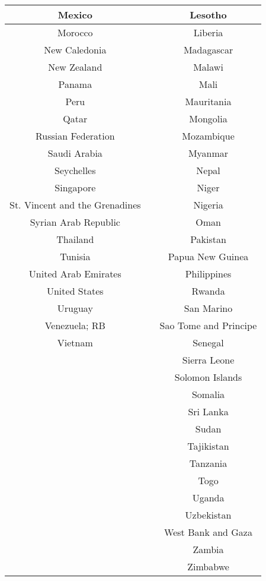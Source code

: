 \begin{center}
\begin{longtable}{|c|c|c|}
\hline
Mexico&&Lesotho\\
\hline
Morocco&&Liberia\\
\hline
New Caledonia&&Madagascar\\
\hline
New Zealand&&Malawi\\
\hline
Panama&&Mali\\
\hline
Peru&&Mauritania\\
\hline
Qatar&&Mongolia\\
\hline
Russian Federation&&Mozambique\\
\hline
Saudi Arabia&&Myanmar\\
\hline
Seychelles&&Nepal\\
\hline
Singapore&&Niger\\
\hline
St. Vincent and the Grenadines&&Nigeria\\
\hline
Syrian Arab Republic&&Oman\\
\hline
Thailand&&Pakistan\\
\hline
Tunisia&&Papua New Guinea\\
\hline
United Arab Emirates&&Philippines\\
\hline
United States&&Rwanda\\
\hline
Uruguay&&San Marino\\
\hline
Venezuela; RB&&Sao Tome and Principe\\
\hline
Vietnam&&Senegal\\
\hline
&&Sierra Leone\\
\hline
&&Solomon Islands\\
\hline
&&Somalia\\
\hline
&&Sri Lanka\\
\hline
&&Sudan\\
\hline
&&Tajikistan\\
\hline
&&Tanzania\\
\hline
&&Togo\\
\hline
&&Uganda\\
\hline
&&Uzbekistan\\
\hline
&&West Bank and Gaza\\
\hline
&&Zambia\\
\hline
&&Zimbabwe\\
\hline
\end{longtable}
\end{center}
